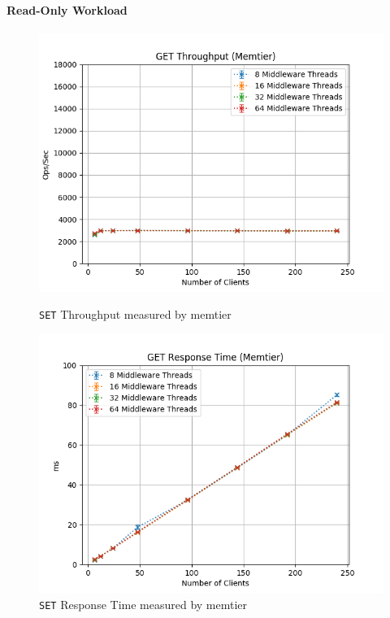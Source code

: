 \documentclass[11pt,a4paper]{article}
\begin{document}
\paragraph{Read-Only Workload}
%
\begin{figure}[H]
	\centering
    \begin{minipage}{0.5\textwidth}
        \centering
        \includegraphics[width=\textwidth]{../illustrations/plots/2_1_one_middleware/0-1/memtier_get_tp_s.png}
        \caption{\texttt{SET} Throughput measured by memtier}
        \label{fig:one_middleware_set_tp_mt}
    \end{minipage}\hfill
    \begin{minipage}{0.5\textwidth}
        \centering
        \includegraphics[width=\textwidth]{../illustrations/plots/2_1_one_middleware/0-1/memtier_get_rt_ms.png}
        \caption{\texttt{SET} Response Time measured by memtier}
        \label{fig:one_middleware_set_rt_mt}
    \end{minipage}
\end{figure}
\end{document}
